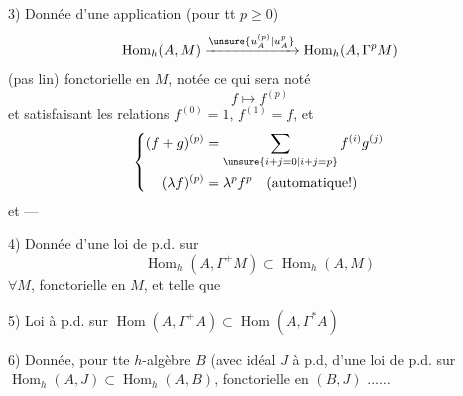 3) Donnée d'une application (pour tt $p\geq0$)
\[
\operatorname{Hom}_h(A,M)\xrightarrow{\unsure{u_A^{(p)}|u_A^p}}\operatorname{Hom}_h(A,\Gamma^p M)
\]
(pas  lin) fonctorielle en $M$, notée
ce qui  sera noté
\[
f\longmapsto f^{(p)}
\]
et satisfaisant les relations $f^{(0)}=1$, $f^{(1)}=f$, et
\[
\left\{\begin{aligned}
(f+g)^{(p)}&=\sum_{\unsure{i+j=0|i+j=p}} f^{(i)}g^{(j)}\\
(\lambda f)^{(p)}&=\lambda^p f^p\quad\text{(automatique!)}
\end{aligned}\right.
\]
et ---

4) Donnée d'une loi de p.d. sur
\[
\operatorname{Hom}_h(A,\Gamma^+M)\subset\operatorname{Hom}_h(A,M)
\]
$\forall M$, fonctorielle en $M$, et telle que

5) Loi à p.d. sur $\operatorname{Hom}(A,\Gamma^+A)\subset\operatorname{Hom}(A,\Gamma^*A)$

6) Donnée, pour tte $h$-algèbre $B$ (avec
idéal $J$ à p.d, d'une loi de
p.d. sur $\operatorname{Hom}_h(A,J)\subset\operatorname{Hom}_h(A,B)$,
fonctorielle en $(B,J)$ $\ldots\ldots$
